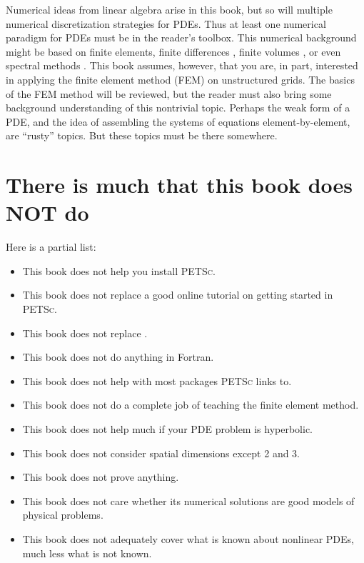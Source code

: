 \documentclass{tufte-book}
\theoremstyle{definition}
\newcommand{\PETSc}{\textsc{PETSc}\xspace}
\begin{document}
Numerical ideas from linear algebra \citep{TrefethenBau} arise in this book, but so will multiple numerical discretization strategies for PDEs.  Thus at least one numerical paradigm for PDEs must be in the reader's toolbox.  This numerical background might be based on finite elements, finite differences \citep{MortonMayers}, finite volumes \citep{LeVeque}, or even spectral methods \citep{KarniadakisSherwin,Trefethen}.  This book assumes, however, that you are, in part, interested in applying the finite element method (FEM) on unstructured grids.  The basics of the FEM method will be reviewed, but the reader must also bring some background understanding of this nontrivial topic.  Perhaps the weak form of a PDE, and the idea of assembling the systems of equations element-by-element, are ``rusty'' topics.  But these topics must be there somewhere.

\section{There is much that this book does NOT do}

Here is a partial list:\begin{itemize}
\item This book does not help you install \PETSc.
\item This book does not replace a good online tutorial on getting started in \PETSc.
\item This book does not replace \citep{Smithetal1996}.
\item This book does not do anything in Fortran.
\item This book does not help with most packages \PETSc links to.
\item This book does not do a complete job of teaching the finite element method.
\item This book does not help much if your PDE problem is hyperbolic.
\item This book does not consider spatial dimensions except 2 and 3.
\item This book does not prove anything.
\item This book does not care whether its numerical solutions are good models of physical problems.
\item This book does not adequately cover what is known about nonlinear PDEs, much less what is not known.
\end{itemize}
\end{document}
